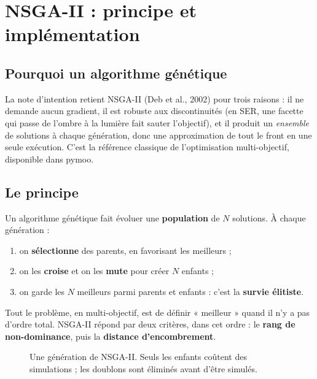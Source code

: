 \chapter{NSGA-II : principe et implémentation}\label{ch:nsga}

\section{Pourquoi un algorithme génétique}
La note d'intention retient NSGA-II (Deb et al., 2002) pour trois raisons : il ne demande aucun gradient, il est robuste aux discontinuités (en SER, une facette qui passe de l'ombre à la lumière fait sauter l'objectif), et il produit un \emph{ensemble} de solutions à chaque génération, donc une approximation de tout le front en une seule exécution. C'est la référence classique de l'optimisation multi-objectif, disponible dans pymoo.

\section{Le principe}
Un algorithme génétique fait évoluer une \textbf{population} de $N$ solutions. À chaque génération :
\begin{enumerate}
\item on \textbf{sélectionne} des parents, en favorisant les meilleurs ;
\item on les \textbf{croise} et on les \textbf{mute} pour créer $N$ enfants ;
\item on garde les $N$ meilleurs parmi parents et enfants : c'est la \textbf{survie élitiste}.
\end{enumerate}
Tout le problème, en multi-objectif, est de définir « meilleur » quand il n'y a pas d'ordre total. NSGA-II répond par deux critères, dans cet ordre : le \textbf{rang de non-dominance}, puis la \textbf{distance d'encombrement}.

\begin{figure}[htbp]
\centering
{}
\caption{Une génération de NSGA-II. Seuls les enfants coûtent des simulations ; les doublons sont éliminés avant d'être simulés.}\label{fig:nsga-cycle}
\end{figure}

